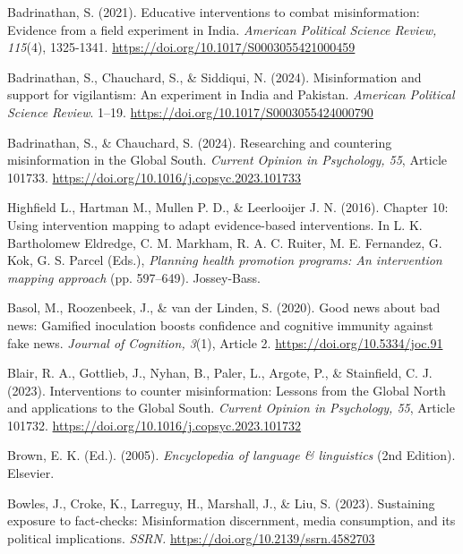 \documentclass[authordate, reflection, issue]{jote-new-article}
\begin{document}
	Badrinathan, S. (2021). Educative interventions to combat misinformation: Evidence from a field experiment in India. \emph{American Political Science Review, 115}(4), 1325-1341. \url{https://doi.org/10.1017/S0003055421000459}



	Badrinathan, S., Chauchard, S., \& Siddiqui, N. (2024). Misinformation and support for vigilantism: An experiment in India and Pakistan. \emph{American Political Science Review}. 1--19. \url{https://doi.org/10.1017/S0003055424000790}



	Badrinathan, S., \& Chauchard, S. (2024). Researching and countering misinformation in the Global South. \emph{Current Opinion in Psychology, 55}, Article 101733. \url{https://doi.org/10.1016/j.copsyc.2023.101733}



	Highfield L., Hartman M., Mullen P. D., \& Leerlooijer J. N. (2016). Chapter 10: Using intervention mapping to adapt evidence-based interventions. In L. K. Bartholomew Eldredge, C. M. Markham, R. A. C. Ruiter, M. E. Fernandez, G. Kok, G. S. Parcel (Eds.), \emph{Planning health promotion programs: An intervention mapping approach} (pp. 597--649). Jossey-Bass.



	Basol, M., Roozenbeek, J., \& van der Linden, S. (2020). Good news about bad news: Gamified inoculation boosts confidence and cognitive immunity against fake news. \emph{Journal of Cognition, 3}(1), Article 2. \url{https://doi.org/10.5334/joc.91}



	Blair, R. A., Gottlieb, J., Nyhan, B., Paler, L., Argote, P., \& Stainfield, C. J. (2023). Interventions to counter misinformation: Lessons from the Global North and applications to the Global South. \emph{Current Opinion in Psychology, 55}, Article 101732. \url{https://doi.org/10.1016/j.copsyc.2023.101732}



	Brown, E. K. (Ed.). (2005). \emph{Encyclopedia of language \& linguistics} (2nd Edition). Elsevier.



	Bowles, J., Croke, K., Larreguy, H., Marshall, J., \& Liu, S. (2023). Sustaining exposure to fact-checks: Misinformation discernment, media consumption, and its political implications. \emph{SSRN.} \url{https://doi.org/10.2139/ssrn.4582703}
\end{document}
